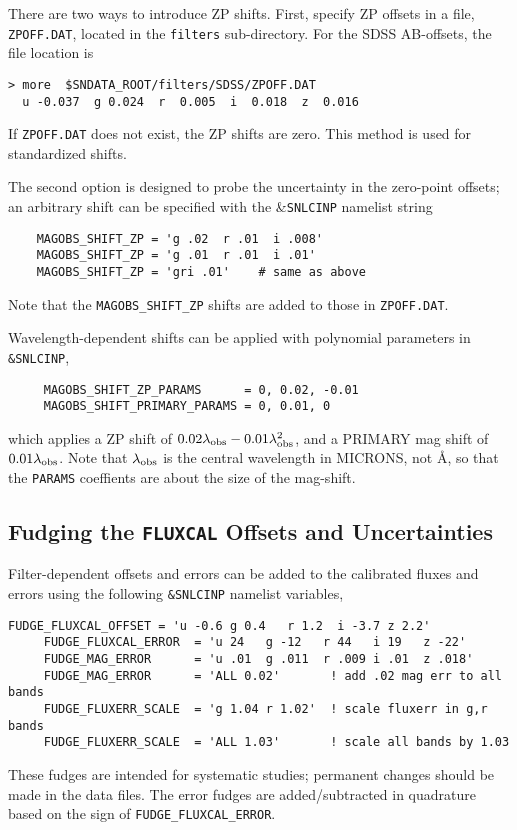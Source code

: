 \documentclass[12pt]{article}
\newcommand{\lamobs}{\lambda_{\rm obs}}
\begin{document}
There are two ways to introduce ZP shifts.
First, specify ZP offsets in a file, {\tt ZPOFF.DAT},
located in the {\tt filters} sub-directory. For the SDSS AB-offsets,
the file location is
%
\begin{Verbatim}[frame=single]
  > more  $SNDATA_ROOT/filters/SDSS/ZPOFF.DAT
  u -0.037  g 0.024  r  0.005  i  0.018  z  0.016 
\end{Verbatim}
If {\tt ZPOFF.DAT} does not exist, the ZP shifts are zero.
This method is used for standardized shifts.

The second option is designed to probe the uncertainty
in the zero-point offsets; an arbitrary shift can be
specified with the \&{\tt SNLCINP} namelist string
%
\begin{verbatim}
    MAGOBS_SHIFT_ZP = 'g .02  r .01  i .008' 
    MAGOBS_SHIFT_ZP = 'g .01  r .01  i .01' 
    MAGOBS_SHIFT_ZP = 'gri .01'    # same as above
\end{verbatim}
%
Note that the {\tt MAGOBS\_SHIFT\_ZP} shifts are
added to those in {\tt ZPOFF.DAT}.

\medskip
Wavelength-dependent shifts can be applied with polynomial
parameters in {\tt \&SNLCINP},
%
\begin{verbatim}  
     MAGOBS_SHIFT_ZP_PARAMS      = 0, 0.02, -0.01 
     MAGOBS_SHIFT_PRIMARY_PARAMS = 0, 0.01, 0
\end{verbatim}
%
which applies a ZP shift of $0.02\lamobs -0.01\lamobs^2$,
and a PRIMARY mag shift of $0.01\lamobs$.
Note that $\lamobs$ is the central wavelength in MICRONS, not \AA,
so that the {\tt PARAMS} coeffients are about the
size of the mag-shift.


   \subsection{Fudging the {\tt FLUXCAL} Offsets and Uncertainties}
   \label{subsec:fudge_fluxcal}

Filter-dependent offsets and errors can be added to the 
calibrated fluxes and errors using the following {\tt \&SNLCINP} 
namelist variables,
%
\begin{Verbatim}[frame=single]
     FUDGE_FLUXCAL_OFFSET = 'u -0.6 g 0.4   r 1.2  i -3.7 z 2.2'
     FUDGE_FLUXCAL_ERROR  = 'u 24   g -12   r 44   i 19   z -22'
     FUDGE_MAG_ERROR      = 'u .01  g .011  r .009 i .01  z .018'
     FUDGE_MAG_ERROR      = 'ALL 0.02'       ! add .02 mag err to all bands
     FUDGE_FLUXERR_SCALE  = 'g 1.04 r 1.02'  ! scale fluxerr in g,r bands
     FUDGE_FLUXERR_SCALE  = 'ALL 1.03'       ! scale all bands by 1.03
\end{Verbatim}
These fudges are intended for  systematic studies;
permanent changes should be made in the data files.
The error fudges are added/subtracted in quadrature
based on the sign of {\tt FUDGE\_FLUXCAL\_ERROR}.
\end{document}

